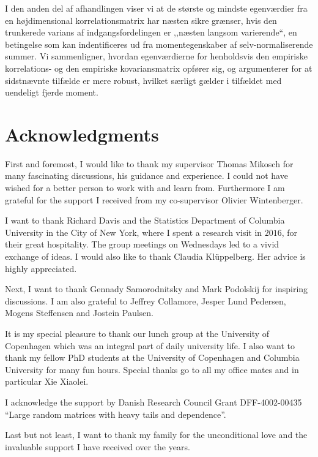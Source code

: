 I den anden del af afhandlingen viser vi at de største og mindste egenværdier fra en højdimensional korrelationsmatrix har næsten sikre grænser, hvis den trunkerede varians af indgangsfordelingen er ,,næsten langsom varierende``, en betingelse som kan indentificeres ud fra momentegenskaber af selv-normaliserende summer. Vi sammenligner, hvordan egenværdierne for 
henholdsvis den empiriske korrelations- og den empiriske kovariansmatrix opfører sig, og argumenterer for at sidstnævnte tilfælde er mere robust, hvilket særligt gælder i tilfældet med uendeligt fjerde moment.

\newpage
\section*{Acknowledgments}

First and foremost, I would like to thank my supervisor Thomas Mikosch for many fascinating discussions, his guidance and experience. I could not have wished for a better person to work with and learn from.  Furthermore I am grateful for the support I received from my co-supervisor Olivier Wintenberger. 

I want to thank Richard Davis and the Statistics Department of Columbia University in the City of New York, where I spent a research visit in $2016$, for their great hospitality. The group meetings on Wednesdays led to a vivid exchange of ideas.
I would also like to thank Claudia Kl\"uppelberg. Her advice is highly appreciated.

Next, I want to thank Gennady Samorodnitsky and Mark Podolskij for inspiring discussions. I am also grateful to Jeffrey Collamore, Jesper Lund Pedersen, Mogens Steffensen and Jostein Paulsen.

It is my special pleasure to thank our lunch group at the University of Copenhagen which was an integral part of daily university life. I also want to thank my fellow PhD students at the University of Copenhagen and Columbia University for many fun hours. Special thanks go to all my office mates and in particular Xie Xiaolei.

I acknowledge the support by Danish Research Council Grant DFF-4002-00435 ``Large random matrices with heavy tails and dependence''. 

Last but not least, I want to thank my family for the unconditional love and the invaluable support I have received over the years.

\bigskip


